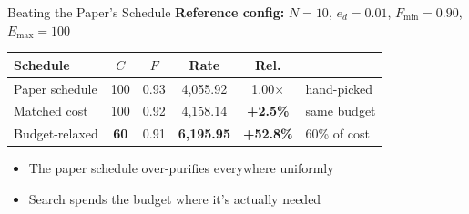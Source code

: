 \documentclass[aspectratio=169, 10pt]{beamer}
\begin{document}
\begin{frame}{Beating the Paper's Schedule}
    \textbf{Reference config:} $N = 10$, $e_d = 0.01$, $F_{\min} = 0.90$, $E_{\max} = 100$

    \vspace{0.2cm}
    \centering
    \small
    \begin{tabularx}{0.95\textwidth}{lccccX}
        \toprule
        \textbf{Schedule} & \textbf{$C$} & \textbf{$F$} & \textbf{Rate} & \textbf{Rel.} & \\
        \midrule
        Paper schedule & 100 & 0.93 & 4,055.92 & 1.00$\times$ & hand-picked \\
        Matched cost & 100 & 0.92 & 4,158.14 & \textbf{+2.5\%} & same budget \\
        Budget-relaxed & \textbf{60} & 0.91 & \textbf{6,195.95} & \textbf{+52.8\%} & 60\% of cost \\
        \bottomrule
    \end{tabularx}

    \vspace{0.4cm}
    \begin{itemize}
        \item The paper schedule over-purifies everywhere uniformly
        \item Search spends the budget where it's actually needed
    \end{itemize}
\end{frame}
\end{document}
